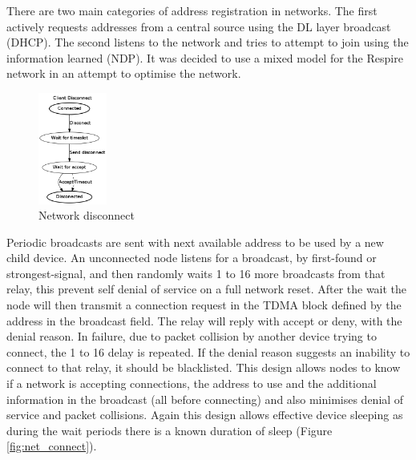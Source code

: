 There are two main categories of address registration in networks. The first actively requests
addresses from a central source using the DL layer broadcast (\eg \ac{DHCP}). The second listens to the
network and tries to attempt to join using the information learned (\eg \ac{NDP}). It was decided to
use a mixed model for the Respire network in an attempt to optimise the network.

\begin{figure}
  \vspace{-10pt}
  \begin{center}
    \includegraphics[width=0.2\textwidth, keepaspectratio=true]{images/Network_Disconnect.png}
  \end{center}
  \caption[Network Disconnect]{Network disconnect}
  \label{fig:net_disconect}
  \vspace{-10pt}
\end{figure}

Periodic broadcasts are sent with next available address to be used by a new child device. An
unconnected node listens for a broadcast, by first-found or strongest-signal, and then randomly
waits 1 to 16 more broadcasts from that relay, this prevent self denial of service on a full network
reset. After the wait the node will then transmit a connection request in the \ac{TDMA} block defined by
the address in the broadcast field. The relay will reply with accept or deny, with the denial reason. In failure, due
to packet collision by another device trying to connect, the 1 to 16 delay is repeated. If the denial
reason suggests an inability to connect to that relay, it should be blacklisted. This design allows
nodes to know if a network is accepting connections, the address to use and the additional
information in the broadcast (all before connecting) and also minimises denial of service and packet
collisions. Again this design allows effective device sleeping as during the wait periods there is a
known duration of sleep (Figure \ref{fig:net_connect}).


